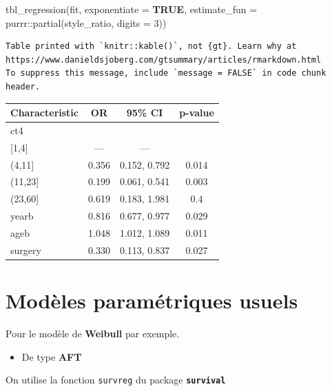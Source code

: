 \documentclass[
  12pt,
  letterpaper,
  DIV=11,
  numbers=noendperiod,
  onepage,
  openany]{scrreprt}
\newenvironment{Shaded}{\begin{snugshade}}{\end{snugshade}}
\newcommand{\AttributeTok}[1]{\textcolor[rgb]{0.80,0.80,0.80}{#1}}
\newcommand{\ConstantTok}[1]{\textcolor[rgb]{0.86,0.64,0.64}{\textbf{#1}}}
\newcommand{\DecValTok}[1]{\textcolor[rgb]{0.86,0.86,0.80}{#1}}
\newcommand{\FunctionTok}[1]{\textcolor[rgb]{0.94,0.94,0.56}{#1}}
\newcommand{\NormalTok}[1]{\textcolor[rgb]{0.80,0.80,0.80}{#1}}
\newcommand{\SpecialCharTok}[1]{\textcolor[rgb]{0.86,0.64,0.64}{#1}}
\providecommand{\tightlist}{%
  \setlength{\itemsep}{0pt}\setlength{\parskip}{0pt}}\usepackage{longtable,booktabs,array}
\begin{document}
\begin{Shaded}
\begin{Highlighting}[]
\FunctionTok{tbl\_regression}\NormalTok{(fit, }\AttributeTok{exponentiate =} \ConstantTok{TRUE}\NormalTok{, }\AttributeTok{estimate\_fun =}\NormalTok{ purrr}\SpecialCharTok{::}\FunctionTok{partial}\NormalTok{(style\_ratio, }\AttributeTok{digits =} \DecValTok{3}\NormalTok{))}
\end{Highlighting}
\end{Shaded}

\begin{verbatim}
Table printed with `knitr::kable()`, not {gt}. Learn why at
https://www.danieldsjoberg.com/gtsummary/articles/rmarkdown.html
To suppress this message, include `message = FALSE` in code chunk header.
\end{verbatim}

\begin{longtable}[]{@{}lccc@{}}
\toprule\noalign{}
\textbf{Characteristic} & \textbf{OR} & \textbf{95\% CI} &
\textbf{p-value} \\
\midrule\noalign{}
\endhead
\bottomrule\noalign{}
\endlastfoot
ct4 & & & \\
{[}1,4{]} & --- & --- & \\
(4,11{]} & 0.356 & 0.152, 0.792 & 0.014 \\
(11,23{]} & 0.199 & 0.061, 0.541 & 0.003 \\
(23,60{]} & 0.619 & 0.183, 1.981 & 0.4 \\
yearb & 0.816 & 0.677, 0.977 & 0.029 \\
ageb & 1.048 & 1.012, 1.089 & 0.011 \\
surgery & 0.330 & 0.113, 0.837 & 0.027 \\
\end{longtable}

\hypertarget{moduxe8les-paramuxe9triques-usuels}{%
\section{Modèles paramétriques
usuels}\label{moduxe8les-paramuxe9triques-usuels}}

Pour le modèle de \textbf{Weibull} par exemple.

\begin{itemize}
\tightlist
\item
  De type \textbf{AFT}
\end{itemize}

On utilise la fonction \texttt{survreg} du package
\textbf{\texttt{survival}}
\end{document}
